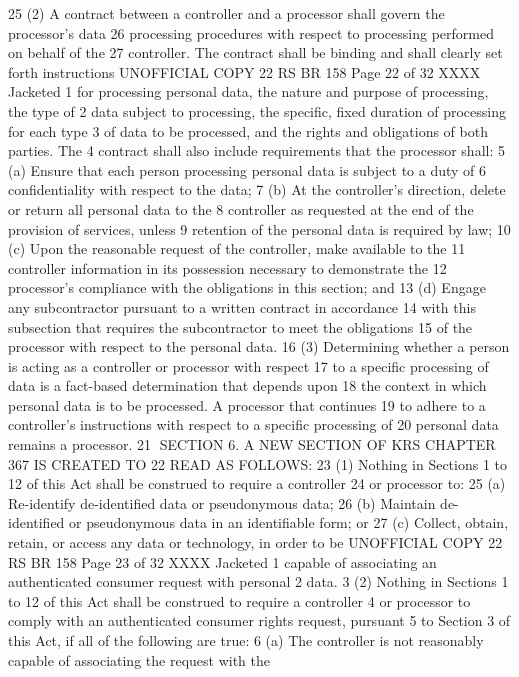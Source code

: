 25 (2) A contract between a controller and a processor shall govern the processor's data
26 processing procedures with respect to processing performed on behalf of the
27 controller. The contract shall be binding and shall clearly set forth instructions 
UNOFFICIAL COPY 22 RS BR 158
Page 22 of 32
XXXX Jacketed
1 for processing personal data, the nature and purpose of processing, the type of
2 data subject to processing, the specific, fixed duration of processing for each type
3 of data to be processed, and the rights and obligations of both parties. The
4 contract shall also include requirements that the processor shall:
5 (a) Ensure that each person processing personal data is subject to a duty of
6 confidentiality with respect to the data;
7 (b) At the controller's direction, delete or return all personal data to the
8 controller as requested at the end of the provision of services, unless
9 retention of the personal data is required by law;
10 (c) Upon the reasonable request of the controller, make available to the
11 controller information in its possession necessary to demonstrate the
12 processor's compliance with the obligations in this section; and
13 (d) Engage any subcontractor pursuant to a written contract in accordance
14 with this subsection that requires the subcontractor to meet the obligations
15 of the processor with respect to the personal data.
16 (3) Determining whether a person is acting as a controller or processor with respect
17 to a specific processing of data is a fact-based determination that depends upon
18 the context in which personal data is to be processed. A processor that continues
19 to adhere to a controller's instructions with respect to a specific processing of
20 personal data remains a processor.
21 SECTION 6. A NEW SECTION OF KRS CHAPTER 367 IS CREATED TO
22 READ AS FOLLOWS:
23 (1) Nothing in Sections 1 to 12 of this Act shall be construed to require a controller
24 or processor to:
25 (a) Re-identify de-identified data or pseudonymous data;
26 (b) Maintain de-identified or pseudonymous data in an identifiable form; or
27 (c) Collect, obtain, retain, or access any data or technology, in order to be 
UNOFFICIAL COPY 22 RS BR 158
Page 23 of 32
XXXX Jacketed
1 capable of associating an authenticated consumer request with personal
2 data.
3 (2) Nothing in Sections 1 to 12 of this Act shall be construed to require a controller
4 or processor to comply with an authenticated consumer rights request, pursuant
5 to Section 3 of this Act, if all of the following are true:
6 (a) The controller is not reasonably capable of associating the request with the
